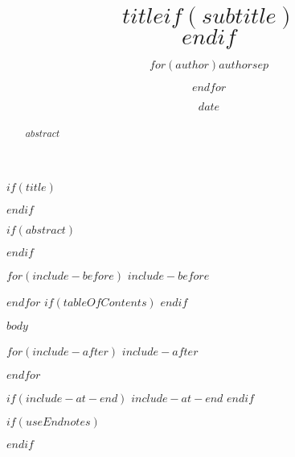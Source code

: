 \documentclass[$if(fontSize)$$fontSize$, $endif$$if(language)$$language$,$else$english,$endif$$if(paperSize)$$paperSize$,$else$ a4paper,$endif$$if(classOptions)$$classOptions$,$endif$$if(twoSided)$twosided,$endif$$if(titlepage)$titlepage$endif$]{$if(documentClass)$$documentClass$$else$article$endif$}
\title{$title$$if(subtitle)$\\\vspace{-0.5em}{\large $subtitle$}$endif$}
\author{$for(author)$$author$$sep$ \and $endfor$}
\date{$date$}
\begin{document}
$if(title)$
	\maketitle
$endif$

$if(abstract)$
	\begin{abstract}
		$abstract$
	\end{abstract}
$endif$

$for(include-before)$
$include-before$

$endfor$
$if(tableOfContents)$
{
\hypersetup{linkcolor=black}
\setcounter{tocdepth}{$toc-depth$}
\tableofcontents
}
$endif$

$body$

$for(include-after)$
$include-after$

$endfor$

$if(include-at-end)$
$include-at-end$
$endif$

$if(useEndnotes)$
\renewcommand{\notesname}{~}



\def\enotesize{\normalsize}
\theendnotes
$endif$
\end{document}
